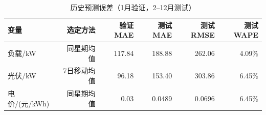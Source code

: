 \begin{table}[H]
\centering\small
\caption{历史预测误差（1月验证，2--12月测试）}
\label{tab:forecast}
\begin{tabular}{lrrrrr}\toprule
变量 & 选定方法 & 验证MAE & 测试MAE & 测试RMSE & 测试WAPE \\\midrule
负载/kW & 同星期均值 & 117.84 & 188.88 & 262.06 & 4.09\% \\
光伏/kW & 7日移动均值 & 96.18 & 153.40 & 303.86 & 6.45\% \\
电价/(元/kWh) & 同星期均值 & 0.03 & 0.0489 & 0.0696 & 6.45\% \\
\bottomrule\end{tabular}
\end{table}
